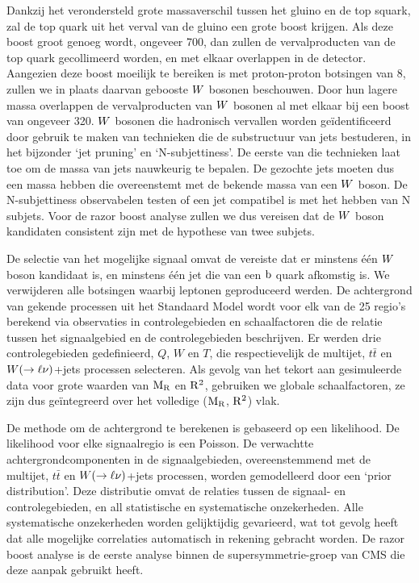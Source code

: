 Dankzij het verondersteld grote massaverschil tussen het gluino en de top squark, zal de top quark
uit het verval van de gluino een grote boost krijgen. Als deze boost groot genoeg wordt, ongeveer
700\GeV, dan zullen de vervalproducten van de top quark gecollimeerd worden, en met elkaar
overlappen in de detector. Aangezien deze boost moeilijk te bereiken is met proton-proton botsingen
van 8\TeV, zullen we in plaats daarvan gebooste $W$ bosonen beschouwen. Door hun lagere massa
overlappen de vervalproducten van $W$ bosonen al met elkaar bij een boost van ongeveer 320\GeV. 
$W$ bosonen die hadronisch vervallen worden ge\"identificeerd door gebruik te maken van technieken
die de substructuur van jets bestuderen, in het bijzonder `jet pruning' en `N-subjettiness'. De
eerste van die technieken laat toe om de massa van jets nauwkeurig te bepalen. De gezochte jets
moeten dus een massa hebben die overeenstemt met de bekende massa van een $W$ boson.
De N-subjettiness observabelen testen of een jet compatibel is met het hebben van N subjets. Voor
de razor boost analyse zullen we dus vereisen dat de $W$ boson kandidaten consistent zijn met de
hypothese van twee subjets. 


De selectie van het mogelijke signaal omvat de vereiste dat er minstens \'e\'en $W$ boson
kandidaat is, en minstens \'e\'en jet die van een $\mathrm{b}$ quark afkomstig is. We verwijderen alle
botsingen waarbij leptonen geproduceerd werden. De achtergrond van gekende processen uit
het Standaard Model wordt voor elk van de 25 regio's berekend via observaties in controlegebieden
en schaalfactoren die de relatie tussen het signaalgebied en de controlegebieden beschrijven. Er
werden drie controlegebieden gedefinieerd, $Q$, $W$ en $T$, die respectievelijk de multijet,
$t\bar{t}$ en $W(\rightarrow \ell\nu)$+jets processen selecteren. 
Als gevolg van het tekort aan gesimuleerde data voor grote waarden van $\mathrm{M_R}$ en $\mathrm{R^2}$, gebruiken
we globale schaalfactoren, ze zijn dus ge\"integreerd over het volledige ($\mathrm{M_R}$, $\mathrm{R^2}$) vlak.


De methode om de achtergrond te berekenen is gebaseerd op een likelihood. De likelihood voor elke
signaalregio is een Poisson. De verwachtte achtergrondcomponenten in de
signaalgebieden, overeenstemmend met de multijet, $t\bar{t}$ en $W(\rightarrow \ell\nu)$+jets
processen, worden gemodelleerd door een `prior distribution'. Deze distributie omvat de relaties
tussen de signaal- en controlegebieden, en all statistische en systematische onzekerheden. Alle
systematische onzekerheden worden gelijktijdig gevarieerd, wat tot gevolg heeft dat alle mogelijke
correlaties automatisch in rekening gebracht worden. 
De razor boost analyse is de eerste analyse binnen de supersymmetrie-groep van CMS die deze aanpak
gebruikt heeft. 

